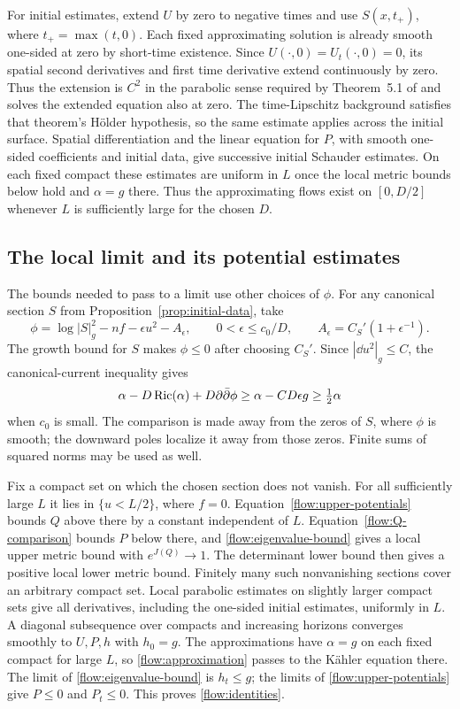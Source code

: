 For initial estimates, extend $U$ by zero to negative times and use
$S(x,t_+)$, where $t_+=\max(t,0)$.  Each fixed approximating solution
is already smooth one-sided at zero by short-time existence.
Since $U(\cdot,0)=U_t(\cdot,0)=0$, its spatial second derivatives
and first time derivative extend continuously by zero.  Thus the
extension is $C^2$ in the parabolic sense required by Theorem~5.1
of \cite{ChuRegularity} and solves the extended equation also at zero.
The time-Lipschitz background satisfies that theorem's H\"older
hypothesis, so the same estimate applies across the initial surface.
Spatial differentiation and the linear equation for $P$, with smooth
one-sided coefficients and initial data, give successive initial
Schauder estimates.  On each fixed compact these estimates are
uniform in $L$ once the local metric bounds below hold and $\alpha=g$
there.  Thus the approximating flows exist on $[0,D/2]$ whenever
$L$ is sufficiently large for the chosen $D$.

\subsection{The local limit and its potential estimates}

The bounds needed to pass to a limit use other choices of $\phi$.
For any canonical section $S$ from
Proposition~\ref{prop:initial-data}, take
\begin{equation}\label{flow:singular-weight}
 \phi=\log|S|_g^2-nf-\epsilon u^2-A_\epsilon,
 \qquad 0<\epsilon\le c_0/D,
 \qquad A_\epsilon=C_S'(1+\epsilon^{-1}).
\end{equation}
The growth bound for $S$ makes $\phi\le0$ after choosing $C_S'$.
Since $|\dd u^2|_g\le C$, the canonical-current inequality gives
\[
 \alpha-D\operatorname{Ric}(\alpha)+D\partial\bar\partial\phi
 \ge\alpha-CD\epsilon g\ge\tfrac12\alpha
\]
when $c_0$ is small.  The comparison is made away from the zeros of
$S$, where $\phi$ is smooth; the downward poles localize it away
from those zeros.  Finite sums of squared norms may be used as well.

Fix a compact set on which the chosen section does not vanish.
For all sufficiently large $L$ it lies in $\{u<L/2\}$, where $f=0$.
Equation~\eqref{flow:upper-potentials} bounds $Q$ above there by a
constant independent of $L$.  Equation~\eqref{flow:Q-comparison}
bounds $P$ below there, and \eqref{flow:eigenvalue-bound} gives a local
upper metric bound with $e^{J(Q)}\to1$.  The determinant lower bound
then gives a positive local lower metric bound.  Finitely many such
nonvanishing sections cover an arbitrary compact set.  Local
parabolic estimates on slightly larger compact sets give all
derivatives, including the one-sided initial estimates, uniformly
in $L$.  A diagonal subsequence over compacts and increasing horizons
converges smoothly to $U,P,h$ with $h_0=g$.  The approximations have
$\alpha=g$ on each fixed compact for large $L$, so
\eqref{flow:approximation} passes to the K\"ahler equation there.
The limit of \eqref{flow:eigenvalue-bound} is $h_t\le g$;
the limits of \eqref{flow:upper-potentials} give $P\le0$ and $P_t\le0$.
This proves \eqref{flow:identities}.

